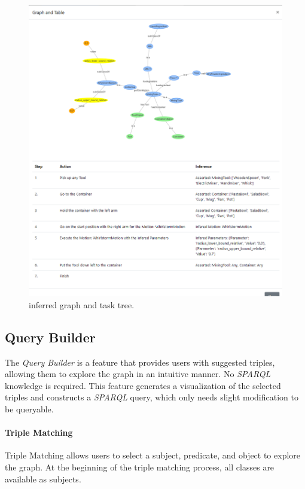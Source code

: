 \begin{figure}[H]
    \includegraphics[scale=0.5]{Graphics/new_inference_graph.png}
    \caption{inferred graph and task tree.}
    \label{fig:graph_inferred}
\end{figure}
\subsection{Query Builder}
The \textit{Query Builder} is a feature that provides users with suggested triples, allowing them to explore the graph in an intuitive manner.
No \textit{SPARQL} knowledge is required. This feature generates a visualization of the selected triples and constructs a \textit{SPARQL} query, 
which only needs slight modification to be queryable.

\paragraph{Triple Matching}
Triple Matching allows users to select a subject, predicate, and object to explore the graph. 
At the beginning of the triple matching process, all classes are available as subjects. 

